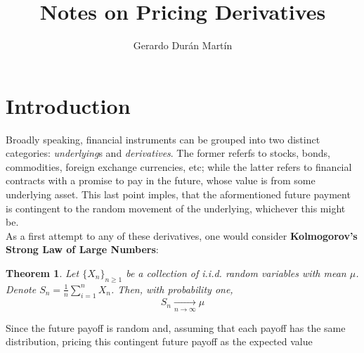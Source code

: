 \documentclass{article}
\title{Notes on Pricing Derivatives}
\author{Gerardo Durán Martín}
\newtheorem{theorem}{Theorem}[section]
\begin{document}
\maketitle


\section{Introduction}
Broadly speaking, financial instruments can be grouped into two distinct categories: \textit{underlying}s and \textit{derivatives}. The former referfs to stocks, bonds, commodities, foreign exchange currencies, etc; while the latter refers to financial contracts with a promise to pay in the future, whose value is  from some underlying asset. This last point imples, that the aformentioned future payment is contingent to the random movement of the underlying, whichever this might be.\\

As a first attempt to  any of these derivatives, one would consider \textbf{Kolmogorov's Strong Law of Large Numbers}:

\begin{theorem}
    Let $\{X_n\}_{n\geq 1}$ be a collection of i.i.d. random variables with mean $\mu$. Denote $S_n = \frac{1}{n}\sum_{i=1}^n X_n$. Then, with probability one,
    \begin{equation}
        S_n \xrightarrow[n \rightarrow \infty]{}\mu
    \end{equation}
\end{theorem}

Since the future payoff is random and, assuming that each payoff has the same distribution, pricing this contingent future payoff as the expected value 
\end{document}
